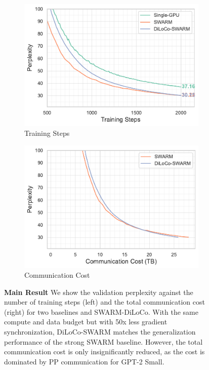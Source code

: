 \documentclass{article}
\begin{document}
\begin{figure}[t]
  \centering
  \begin{subfigure}[b]{0.48\textwidth}
    \centering
    \includegraphics[width=\textwidth]{figures/experiment1-1.pdf}
    \caption{Training Steps}
    \label{fig:experiment1-1}
  \end{subfigure}
  \hfill
  \begin{subfigure}[b]{0.48\textwidth}
    \centering
    \includegraphics[width=\textwidth]{figures/experiment1-2.pdf}
    \caption{Communication Cost}
    \label{fig:experiment1-2}
  \end{subfigure}
  \caption{\textbf{Main Result} We show the validation perplexity against the
  number of training steps (left) and the total communication cost (right) for
  two baselines and SWARM-DiLoCo. With the same compute and data budget but with
  50x less gradient synchronization, DiLoCo-SWARM matches the generalization
  performance of the strong SWARM baseline. However, the total communication
  cost is only insignificantly reduced, as the cost is dominated by PP
  communication for GPT-2 Small.}
  \label{fig:experiment1}
\end{figure}
\end{document}
